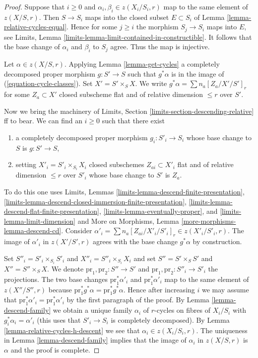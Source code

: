 \begin{proof}
Suppose that $i \geq 0$ and $\alpha_i, \beta_i \in z(X_i/S_i, r)$
map to the same element of $z(X/S, r)$. Then $S \to S_i$
maps into the closed subset $E \subset S_i$ of
Lemma \ref{lemma-relative-cycles-equal}.
Hence for some $j \geq i$ the morphism $S_j \to S_i$
maps into $E$, see Limits, Lemma
\ref{limits-lemma-limit-contained-in-constructible}.
It follows that the base change of
$\alpha_i$ and $\beta_i$ to $S_j$ agree. Thus the map is injective.

\medskip\noindent
Let $\alpha \in z(X/S, r)$. Applying Lemma \ref{lemma-get-cycles}
a completely decomposed proper morphism $g : S' \to S$ such that $g^*\alpha$
is in the image of (\ref{equation-cycle-classes}).
Set $X' = S' \times_S X$. We write $g^*\alpha = \sum n_a [Z_a/X'/S']_r$
for some $Z_a \subset X'$ closed subscheme
flat and of relative dimension $\leq r$ over $S'$.

\medskip\noindent
Now we bring the machinery of
Limits, Section \ref{limits-section-descending-relative} ff to bear.
We can find an $i \geq 0$ such that there exist
\begin{enumerate}
\item a completely decomposed proper morphism $g_i : S'_i \to S_i$
whose base change to $S$ is $g : S' \to S$,
\item setting $X'_i = S'_i \times_{S_i} X_i$
closed subschemes $Z_{ai} \subset X'_i$ flat and of
relative dimension $\leq r$ over $S'_i$ whose base change to $S'$
is $Z_a$.
\end{enumerate}
To do this one uses Limits, Lemmas
\ref{limits-lemma-descend-finite-presentation},
\ref{limits-lemma-descend-closed-immersion-finite-presentation},
\ref{limits-lemma-descend-flat-finite-presentation},
\ref{limits-lemma-eventually-proper}, and
\ref{limits-lemma-limit-dimension}
and More on Morphisms, Lemma
\ref{more-morphisms-lemma-descend-cd}.
Consider
$\alpha'_i = \sum n_a [Z_{ai}/X'_i/S'_i]_r \in z(X'_i/S'_i, r)$.
The image of $\alpha'_i$ in $z(X'/S', r)$ agrees with the base change
$g^*\alpha$ by construction.

\medskip\noindent
Set $S''_i = S'_i \times_{S_i} S'_i$ and $X''_i = S''_i \times_{S_i} X_i$
and set $S'' = S' \times_S S'$ and $X'' = S'' \times_S X$.
We denote $\text{pr}_1, \text{pr}_2 : S'' \to S'$ and
$\text{pr}_1, \text{pr}_2 : S''_i \to S'_i$ the projections.
The two base changes $\text{pr}_1^*\alpha'_i$ and $\text{pr}_1^*\alpha'_i$
map to the same element of $z(X''/S'', r)$ because
$\text{pr}_1^*g^*\alpha = \text{pr}_1^*g^*\alpha$.
Hence after increasing $i$ we may assume that
$\text{pr}_1^*\alpha'_i = \text{pr}_1^*\alpha'_i$
by the first paragraph of the proof.
By Lemma \ref{lemma-descend-family}
we obtain a unique family $\alpha_i$
of $r$-cycles on fibres of $X_i/S_i$
with $g_i^*\alpha_i = \alpha'_i$ (this uses that $S'_i \to S_i$
is completely decomposed).
By Lemma \ref{lemma-relative-cycles-h-descent}
we see that $\alpha_i \in z(X_i/S_i, r)$.
The uniqueness in Lemma \ref{lemma-descend-family} implies that the
image of $\alpha_i$ in $z(X/S, r)$ is $\alpha$ and the proof is complete.
\end{proof}

